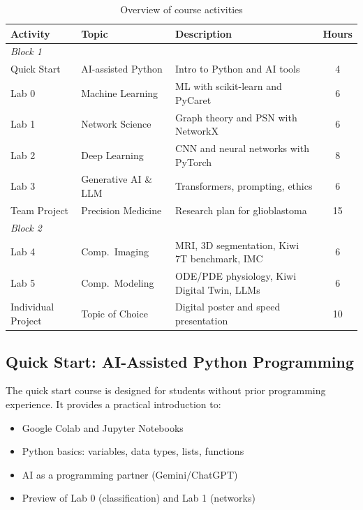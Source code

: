 \documentclass[11pt,a4paper]{article}
\begin{document}
\begin{table}[htbp]
\centering
\caption{Overview of course activities}
\label{tab:activities}
\begin{tabular}{@{}llp{5.5cm}c@{}}
\toprule
\textbf{Activity} & \textbf{Topic} & \textbf{Description} & \textbf{Hours} \\
\midrule
\multicolumn{4}{l}{\textit{Block 1}} \\
\midrule
Quick Start & AI-assisted Python & Intro to Python and AI tools & 4 \\
Lab 0 & Machine Learning & ML with scikit-learn and PyCaret & 6 \\
Lab 1 & Network Science & Graph theory and PSN with NetworkX & 6 \\
Lab 2 & Deep Learning & CNN and neural networks with PyTorch & 8 \\
Lab 3 & Generative AI \& LLM & Transformers, prompting, ethics & 6 \\
Team Project & Precision Medicine & Research plan for glioblastoma & 15 \\
\midrule
\multicolumn{4}{l}{\textit{Block 2}} \\
\midrule
Lab 4 & Comp.\ Imaging & MRI, 3D segmentation, Kiwi 7T benchmark, IMC & 6 \\
Lab 5 & Comp.\ Modeling & ODE/PDE physiology, Kiwi Digital Twin, LLMs & 6 \\
Individual Project & Topic of Choice & Digital poster and speed presentation & 10 \\
\bottomrule
\end{tabular}
\end{table}

\subsection{Quick Start: AI-Assisted Python Programming}

The quick start course is designed for students without prior programming experience. It provides a practical introduction to:

\begin{itemize}[nosep]
    \item Google Colab and Jupyter Notebooks
    \item Python basics: variables, data types, lists, functions
    \item AI as a programming partner (Gemini/ChatGPT)
    \item Preview of Lab 0 (classification) and Lab 1 (networks)
\end{itemize}
\end{document}
